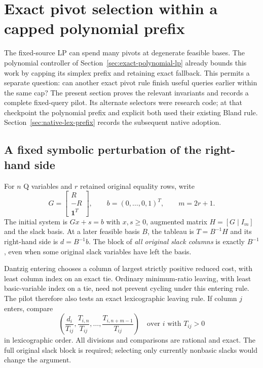 \section{Exact pivot selection within a capped polynomial prefix}
\label{sec:capped-pivot-pilot}

The fixed-source LP can spend many pivots at degenerate feasible bases.
The polynomial controller of Section~\ref{sec:exact-polynomial-lp} already
bounds this work by capping its simplex prefix and retaining exact fallback.
This permits a separate question: can another exact pivot rule finish
useful queries earlier within the same cap?  The present section proves
the relevant invariants and records a complete fixed-query pilot.  Its
alternate selectors were research code; at that checkpoint the polynomial
prefix and explicit  both used their existing Bland rule.
Section~\ref{sec:native-lex-prefix} records the subsequent native adoption.

\subsection{A fixed symbolic perturbation of the right-hand side}

For $n$ Q variables and $r$ retained original equality rows, write
\[
 G=\begin{bmatrix}R\\-R\\\mathbf1^T\end{bmatrix},\qquad
 b=(0,\ldots,0,1)^T,\qquad m=2r+1.
\]
The initial system is $Gx+s=b$ with $x,s\ge0$, augmented matrix
$H=[G\mid I_m]$ and the slack basis.  At a later feasible basis $B$,
the tableau is $T=B^{-1}H$ and its right-hand side is $d=B^{-1}b$.
The block of \emph{all original slack columns} is exactly $B^{-1}$,
even when some original slack variables have left the basis.

Dantzig entering chooses a column of largest strictly positive reduced
cost, with least column index on an exact tie.  Ordinary minimum-ratio
leaving, with least basic-variable index on a tie, need not prevent
cycling under this entering rule.  The pilot therefore also tests an
exact lexicographic leaving rule.  If column $j$ enters, compare
\[
 \left(\frac{d_i}{T_{ij}},
       \frac{T_{i,n}}{T_{ij}},\ldots,
       \frac{T_{i,n+m-1}}{T_{ij}}\right)
       \quad\text{over }i\text{ with }T_{ij}>0
\]
in lexicographic order.  All divisions and comparisons are rational and
exact.  The full original slack block is required; selecting only currently
nonbasic slacks would change the argument.

